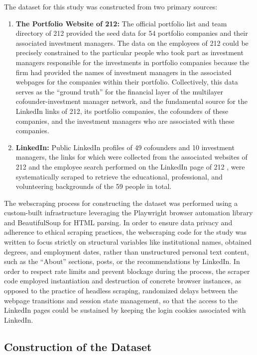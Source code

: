 \documentclass[conference]{IEEEtran}
\begin{document}
The dataset for this study was constructed from two primary sources:
\begin{enumerate}
    \item{\textbf{The Portfolio Website of 212:}{ The official portfolio list \cite{212portfolio} and team directory \cite{212team} of 212 provided the seed data for 54 portfolio companies and their associated investment managers. The data on the employees of 212 could be precisely constrained to the particular people who took part as investment managers responsible for the investments in portfolio companies because the firm had provided the names of investment managers in the associated webpages for the companies within their portfolio. Collectively, this data serves as the ``ground truth'' for the financial layer of the multilayer cofounder-investment manager network, and the fundamental source for the LinkedIn links of 212, its portfolio companies, the cofounders of these companies, and the investment managers who are associated with these companies.}}
    \item{\textbf{LinkedIn:}{ Public LinkedIn profiles of 49 cofounders and 10 investment managers, the links for which were collected from the associated websites of 212 and the employee search performed on the LinkedIn page of 212 \cite{212linkedin}, were systematically scraped to retrieve the educational, professional, and volunteering backgrounds of the 59 people in total.}}
\end{enumerate}

The webscraping process for constructing the dataset was performed using a custom-built infrastructure leveraging the Playwright browser automation library and BeautifulSoup for HTML parsing. In order to ensure data privacy and adherence to ethical scraping practices, the webscraping code for the study was written to focus strictly on structural variables like institutional names, obtained degrees, and employment dates, rather than unstructured personal text content, such as the ``About'' sections, posts, or the recommendations by LinkedIn. In order to respect rate limits and prevent blockage during the process, the scraper code employed instantiation and destruction of concrete browser instances, as opposed to the practice of headless scraping, randomized delays between the webpage transitions and session state management, so that the access to the LinkedIn pages could be sustained by keeping the login cookies associated with LinkedIn.

\subsection{Construction of the Dataset}
\end{document}
